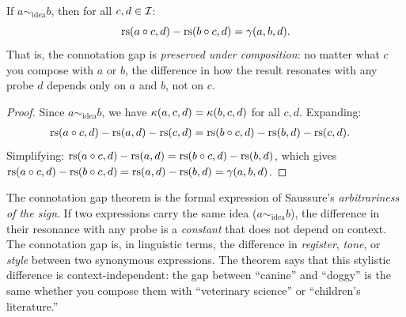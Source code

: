 \begin{theorem}\label{thm:connotation-gap}
If $a \sim_{\mathrm{idea}} b$, then for all $c, d \in \mathcal{I}$:
\[
    \mathrm{rs}(a \circ c, d) - \mathrm{rs}(b \circ c, d) = \gamma(a, b, d).
\]
That is, the connotation gap is \emph{preserved under composition}: no
matter what $c$ you compose with $a$ or $b$, the difference in how the
result resonates with any probe $d$ depends only on $a$ and $b$, not on
$c$.
\end{theorem}
\begin{proof}
Since $a \sim_{\mathrm{idea}} b$, we have $\kappa(a,c,d) =
\kappa(b,c,d)$ for all $c, d$. Expanding:
\begin{align*}
    \mathrm{rs}(a \circ c, d) - \mathrm{rs}(a,d) - \mathrm{rs}(c,d) &=
    \mathrm{rs}(b \circ c, d) - \mathrm{rs}(b,d) - \mathrm{rs}(c,d).
\end{align*}
Simplifying: $\mathrm{rs}(a \circ c, d) - \mathrm{rs}(a,d) =
\mathrm{rs}(b \circ c, d) - \mathrm{rs}(b,d)$, which gives
$\mathrm{rs}(a \circ c, d) - \mathrm{rs}(b \circ c, d) =
\mathrm{rs}(a,d) - \mathrm{rs}(b,d) = \gamma(a,b,d)$.
\end{proof}

\begin{interpretation}
The connotation gap theorem is the formal expression of Saussure's
\emph{arbitrariness of the sign}. If two expressions carry the same idea
($a \sim_{\mathrm{idea}} b$), the difference in their resonance with
any probe is a \emph{constant} that does not depend on context. The
connotation gap is, in linguistic terms, the difference in
\emph{register}, \emph{tone}, or \emph{style} between two synonymous
expressions. The theorem says that this stylistic difference is
context-independent: the gap between ``canine'' and ``doggy'' is the
same whether you compose them with ``veterinary science'' or ``children's
literature.''
\end{interpretation}

